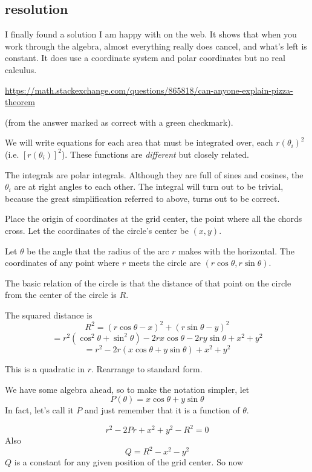\documentclass[11pt, oneside]{article}
\begin{document}
\subsection*{resolution}

I finally found a solution I am happy with on the web.  It shows that when you work through the algebra, almost everything really does cancel, and what's left is constant.  It does use a coordinate system and polar coordinates but no real calculus.

\url{https://math.stackexchange.com/questions/865818/can-anyone-explain-pizza-theorem}

(from the answer marked as correct with a green checkmark).

We will write equations for each area that must be integrated over, each $r(\theta_i)^2$ (i.e. $[r(\theta_i)]^2$).  These functions are \emph{different} but closely related.  

The integrals are polar integrals.  Although they are full of sines and cosines, the $\theta_i$ are at right angles to each other.  The integral will turn out to be trivial, because the great simplification referred to above, turns out to be correct.

Place the origin of coordinates at the grid center, the point where all the chords cross.  Let the coordinates of the circle's center be $(x, y)$.

Let $\theta$ be the angle that the radius of the arc $r$ makes with the horizontal.  The coordinates of any point where $r$ meets the circle are $( r \cos \theta, r \sin \theta)$.  

The basic relation of the circle is that the distance of that point on the circle from the center of the circle is $R$.  

The squared distance is
\[ R^2 = (r \cos \theta - x)^2 + (r \sin \theta - y)^2 \]
\[ = r^2 (\cos^2 \theta + \sin^2 \theta) - 2r x \cos \theta - 2 ry \sin \theta + x^2 + y^2 \]
\[ = r^2 - 2r (x \cos \theta + y \sin \theta) + x^2 + y^2 \]

This is a quadratic in $r$.  Rearrange to standard form.

We have some algebra ahead, so to make the notation simpler, let
\[ P(\theta) = x \cos \theta + y \sin \theta \]
In fact, let's call it $P$ and just remember that it is a function of $\theta$.

\[ r^2 - 2Pr + x^2 + y^2 - R^2 = 0 \]
Also
\[ Q = R^2 - x^2 - y^2 \]
$Q$ is a constant for any given position of the grid center.  So now
\end{document}
